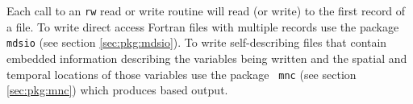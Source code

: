 Each call to an {\tt rw} read or write routine will read (or write) to
the first record of a file. To write direct access Fortran files with
multiple records use the package {\tt mdsio} (see section
\ref{sec:pkg:mdsio}).  To write self-describing files that contain
embedded information describing the variables being written and the
spatial and temporal locations of those variables use the package {\tt
  mnc} (see section \ref{sec:pkg:mnc}) which produces
\cite{rew:97} based output.


